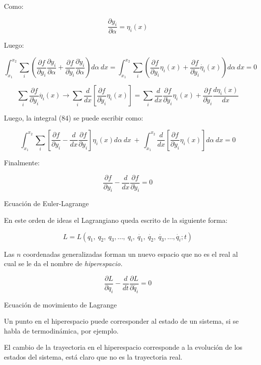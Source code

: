 \documentclass[]{article}
\begin{document}
Como:

\[\frac{\partial y_{i}}{\partial\alpha} = \eta_{i}(x)\]

Luego:

\[\int_{x_{1}}^{x_{2}}{\sum_{i}^{}{\left( \frac{\partial f}{\partial y_{i}}\frac{\partial y_{i}}{\partial\alpha} + \frac{\partial f}{\partial{\dot{y}}_{i}}\frac{\partial{\dot{y}}_{i}}{\partial\alpha} \right)d\alpha\ dx} =}\int_{x_{1}}^{x_{2}}{\sum_{i}^{}{\left( \frac{\partial f}{\partial y_{i}}\eta_{i}(x) + \frac{\partial f}{\partial{\dot{y}}_{i}}\dot{\eta_{i}}(x) \right)d\alpha\ dx}} = 0\]

\[\sum_{i}^{}{\frac{\partial f}{\partial{\dot{y}}_{i}}\dot{\eta_{i}}(x)} \rightarrow \sum_{i}^{}{\frac{d}{dx}\left\lbrack \frac{\partial f}{\partial{\dot{y}}_{i}}\eta_{i}(x) \right\rbrack} = \sum_{i}^{}{\frac{d}{dx}\frac{\partial f}{\partial{\dot{y}}_{i}}\eta_{i}(x) + \frac{\partial f}{\partial{\dot{y}}_{i}}\frac{d\eta_{i}(x)}{dx}}\]

Luego, la integral (84) se puede escribir como:

\[\int_{x_{1}}^{x_{2}}{\sum_{i}^{}{\left\lbrack \frac{\partial f}{\partial y_{i}} - \frac{d}{dx}\frac{\partial f}{\partial{\dot{y}}_{i}} \right\rbrack\eta_{i}(x)d\alpha\ dx}\  + \ \int_{x_{1}}^{x_{2}}{\frac{d}{dx}\left\lbrack \frac{\partial f}{\partial{\dot{y}}_{i}}\eta_{i}(x) \right\rbrack d\alpha\ dx} = 0}\]

Finalmente:

\[\frac{\partial f}{\partial y_{i}} - \frac{d}{dx}\frac{\partial f}{\partial{\dot{y}}_{i}} = 0\]

Ecuación de Euler-Lagrange

En este orden de ideas el Lagrangiano queda escrito de la siguiente
forma:

\[L = L(q_{1},\ q_{2},\ q_{3},\ldots,\ q_{i},\ \dot{q_{1}},\ \dot{q_{2}},\ \dot{q_{3}},\ldots,\dot{q_{i}};t)\]

Las \(n\) coordenadas generalizadas forman un nuevo espacio que no es el
real al cual se le da el nombre de \emph{hiperespacio.}

\[\frac{\partial L}{\partial q_{i}} - \frac{d}{dt}\frac{\partial L}{\partial\dot{q_{i}}} = 0\]

Ecuación de movimiento de Lagrange

Un punto en el hiperespacio puede corresponder al estado de un sistema,
si se habla de termodinámica, por ejemplo.

El cambio de la trayectoria en el hiperespacio corresponde a la
evolución de los estados del sistema, está claro que no es la
trayectoria real.
\end{document}
